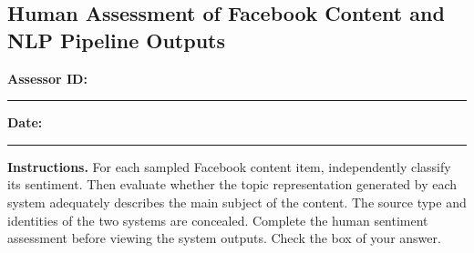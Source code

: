 \documentclass[12pt,a4paper]{report}
\begin{document}
	\subsection*{Human Assessment of Facebook Content and NLP Pipeline Outputs}
	
		\small
		\noindent
		\textbf{Assessor ID:} \rule{3cm}{0.4pt}
		\hfill
		\textbf{Date:} \rule{3cm}{0.4pt}
		
		\textbf{Instructions.}
		For each sampled Facebook content item, independently classify
		its sentiment. Then evaluate whether the topic representation
		generated by each system adequately describes the main subject
		of the content. The source type and identities of the two
		systems are concealed. Complete the human sentiment assessment
		before viewing the system outputs. Check the box of your answer.
		\setlength{\tabcolsep}{5pt}
		\renewcommand{\arraystretch}{1.6}
		
\end{document}
